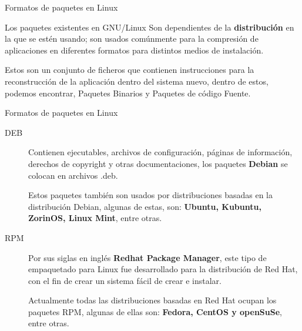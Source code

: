 \begin{frame}[c]{Formatos de paquetes en Linux}

  \begin{block}{Los paquetes existentes en GNU/Linux}
    Son dependientes de la
    \textbf{distribución} en la que se estén usando; son usados comúnmente
    para la compresión de aplicaciones en diferentes formatos para
    distintos medios de instalación.
  \end{block}

  \vspace{\baselineskip}
  Estos son un conjunto de ficheros que contienen instrucciones para la
  reconstrucción de la aplicación dentro del sistema nuevo, dentro de estos,
  podemos encontrar, Paquetes Binarios y Paquetes de código Fuente.
\end{frame}

\begin{frame}[c]{Formatos de paquetes en Linux}
  \begin{description}
    \item [DEB] Contienen ejecutables, archivos de configuración,
      páginas de información, derechos de copyright y otras documentaciones,
      los paquetes \textbf{Debian} se colocan en archivos .deb.

      Estos paquetes también son usados por distribuciones basadas en la
      distribución Debian, algunas de estas, son: \textbf{Ubuntu, Kubuntu,
      ZorinOS, Linux Mint}, entre otras.

    \pausa
    \item [RPM] Por sus siglas en inglés \textbf{Redhat Package Manager},
      este tipo de empaquetado para Linux fue desarrollado para la
      distribución de Red Hat, con el fin de crear un sistema fácil de crear
      e instalar.

      Actualmente todas las distribuciones basadas en Red Hat ocupan los
      paquetes RPM, algunas de ellas son: \textbf{Fedora, CentOS y openSuSe},
      entre otras.
  \end{description}
\end{frame}

